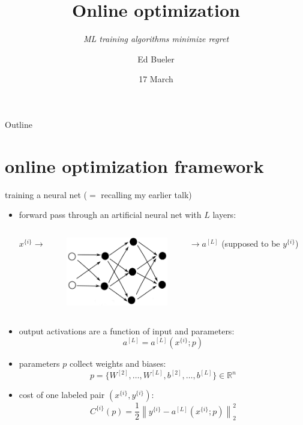 \documentclass[xcolor={svgnames},
               hyperref={colorlinks,citecolor=DeepPink4,linkcolor=FireBrick,urlcolor=Maroon}]
               {beamer}
\title{Online optimization}
\subtitle{\emph{ML training algorithms minimize regret}}
\author{Ed Bueler}
\institute[UAF]{MATH 692 Mathematics for Machine Learning}
\date[Spring 2022]{17 March}
\newcommand{\RR}{\mathbb{R}}
\begin{document}
\beamertemplatenavigationsymbolsempty

\begin{frame}
  \maketitle
\end{frame}


\begin{frame}{Outline}
  \tableofcontents[hideallsubsections]
\end{frame}


\section{online optimization framework}

\begin{frame}{training a neural net ($=$ recalling my earlier talk)}

\begin{itemize}
\item forward pass through an artificial neural net with $L$ layers:

\begin{columns}
\begin{column}{0.1\textwidth}
$x^{\{i\}}\to$ 
\end{column}
\begin{column}{0.4\textwidth}
\includegraphics[height=30mm]{figs/cleannet.png}
\end{column}
\begin{column}{0.45\textwidth}
$\to a^{[L]}$ \hfill (supposed to be $y^{\{i\}}$)
\end{column}
\end{columns}

\item output activations are a function of input and parameters:
    $$a^{[L]} = a^{[L]}(x^{\{i\}}; p)$$
\item parameters $p$ collect weights and biases:
    $$p=\{W^{[2]},\dots,W^{[L]},b^{[2]},\dots,b^{[L]}\} \in \RR^n$$
\item cost of one labeled pair $(x^{\{i\}},y^{\{i\}})$:
    $$C^{\{i\}}(p) = \frac{1}{2} \left\|y^{\{i\}} - a^{[L]}(x^{\{i\}}; p)\right\|_2^2$$
\end{itemize}
\end{frame}
\end{document}
